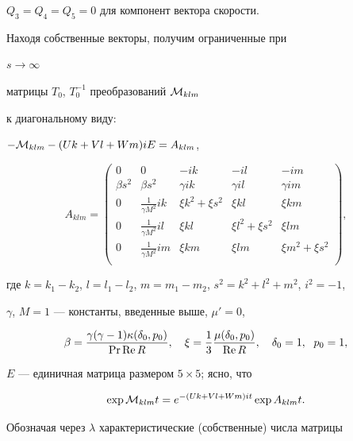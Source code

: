 $Q_3=Q_4=Q_5=0$ для компонент вектора скорости.


Находя собственные векторы, получим ограниченные при


$s\rightarrow\infty$


матрицы $T_0$, $T_0^{-1}$ преобразований ${\cal{M}}_{klm}$


к диагональному виду:


$-{\cal{M}}_{klm}-(Uk+Vl+Wm)iE=A_{klm}$,


$$


A_{klm}=


\begin{pmatrix}


0 & 0 & -ik & -il & -im\\


\beta s^2 & \beta s^2 & \gamma ik & \gamma il & \gamma im\\


0 & \frac{1}{\gamma M^2}ik & \xi k^2+\xi s^2 & \xi kl & \xi km\\


0 & \frac{1}{\gamma M^2}il & \xi kl & \xi l^2+\xi s^2 & \xi lm\\


0 & \frac{1}{\gamma M^2}im & \xi km & \xi lm & \xi m^2+\xi s^2\\


\end{pmatrix}


,


$$


где $k=k_1-k_2$, $l=l_1-l_2$, $m=m_1-m_2$, $s^2=k^2+l^2+m^2$, $i^2=-1$,


$\gamma$, $M=1$ --- константы, введенные выше, $\mu'=0$,


$$


\beta=\frac{\gamma(\gamma-1)\kappa(\delta_0,p_0)}{\Pro\re R},\quad


\xi=\frac{1}{3}\frac{\mu(\delta_0,p_0)}{\re R},\quad


\delta_0=1,\ \; p_0=1,


$$


$E$ --- единичная матрица размером $5\times 5$; ясно, что


\begin{equation}


\label{expo}


\exp {\cal{M}}_{klm}t=e^{-(Uk+Vl+Wm)it}\exp A_{klm}t.


\end{equation}


Обозначая через $\lambda$ характеристические (собственные) числа матрицы



